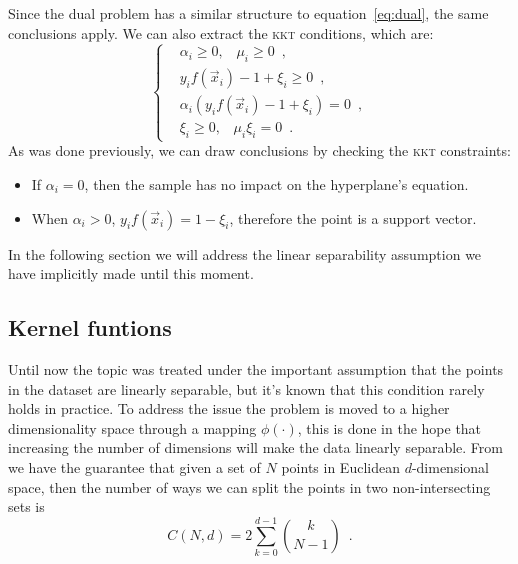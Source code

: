Since the dual problem has a similar structure to equation~\ref{eq:dual}, the same conclusions
apply. We can also extract the \textsc{kkt} conditions, which are:
\begin{equation}
	\label{eq:sm-kkt}
	\begin{cases}
		 & \alpha_i \geq 0, \hspace{10pt}\mu_i \geq 0 \enspace, \\
		 & y_if(\vec{x}_i) - 1 + \xi_i \geq 0 \enspace,         \\
		 & \alpha_i(y_if(\vec{x}_i) - 1 + \xi_i) = 0 \enspace,  \\
		 & \xi_i \geq 0, \hspace{10pt} \mu_i\xi_i = 0 \enspace.
	\end{cases}
\end{equation}
As was done previously, we can draw conclusions by checking the \textsc{kkt} constraints:
\begin{itemize}
	\item If $\alpha_i = 0$, then the sample has no impact on the hyperplane's equation.
	\item When $\alpha_i > 0$, $y_if(\vec{x}_i) = 1 - \xi_i$, therefore the point is a
		support vector.
\end{itemize}

In the following section we will address the linear separability assumption we have implicitly made
until this moment.

\subsection{Kernel funtions}
\label{sec:kernel-functions}
Until now the topic was treated under the important assumption that the points in the dataset are
linearly separable, but it's known that this condition rarely holds in practice. To address the issue the
problem is moved to a higher dimensionality space through a mapping $\phi(\cdot)$, this is done in
the hope that increasing the number of dimensions will make the data linearly separable.
From~\cite{cover1965} we have the guarantee that given a set of $N$ points in Euclidean
$d$-dimensional space, then the number of ways we can split the points in two non-intersecting sets
is
\begin{equation}
	\label{eq:dichotomies}
	C(N, d) = 2 \sum_{k = 0}^{d - 1}\binom{k}{N - 1} \enspace.
\end{equation}

